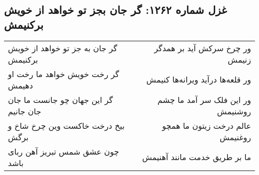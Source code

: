 \begin{center}
\section*{غزل شماره ۱۲۶۲: گر جان بجز تو خواهد از خویش برکنیمش}
\label{sec:1262}
\begin{longtable}{l p{0.5cm} r}
گر جان به جز تو خواهد از خویش برکنیمش
&&
ور چرخ سرکش آید بر همدگر زنیمش
\\
گر رخت خویش خواهد ما رخت او دهیمش
&&
ور قلعه‌ها درآید ویرانه‌ها کنیمش
\\
گر این جهان چو جانست ما جان جان جانیم
&&
ور این فلک سر آمد ما چشم روشنیمش
\\
بیخ درخت خاکست وین چرخ شاخ و برگش
&&
عالم درخت زیتون ما همچو روغنیمش
\\
چون عشق شمس تبریز آهن ربای باشد
&&
ما بر طریق خدمت مانند آهنیمش
\\
\end{longtable}
\end{center}
